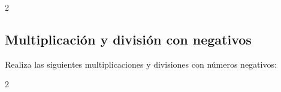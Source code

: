 \documentclass[12pt,examen,answers]{repaso_layout}
\begin{document}
\begin{questions}
      \begin{multicols}{2}
      \end{multicols}

      
	\subsection{Multiplicación y división con negativos}

      \question[4] Realiza las siguientes multiplicaciones y divisiones con números negativos:
    
      \begin{multicols}{2}
\end{multicols}
\end{questions}
\end{document}
